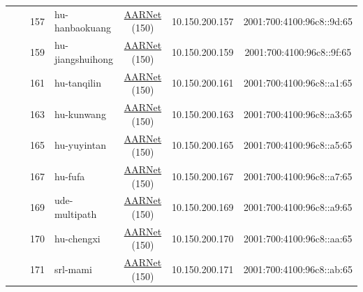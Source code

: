 \begin{small}
\begin{center}
\begin{longtable}{|c|c|c|c|c|c|c|c|}
  &  & \tiny{157} & \multicolumn{1}{|l|}{\tiny{hu-hanbaokuang}} & \multicolumn{2}{|c|}{\tiny{\href{https://www.aarnet.edu.au/}{AARNet} (150)}} & \tiny{10.150.200.157} & \tiny{2001:700:4100:96c8::9d:65} \\* \cline{3-3}\cline{4-4}\cline{5-5}\cline{6-6}\cline{7-7}\cline{8-8}
  &  & \tiny{159} & \multicolumn{1}{|l|}{\tiny{hu-jiangshuihong}} & \multicolumn{2}{|c|}{\tiny{\href{https://www.aarnet.edu.au/}{AARNet} (150)}} & \tiny{10.150.200.159} & \tiny{2001:700:4100:96c8::9f:65} \\* \cline{3-3}\cline{4-4}\cline{5-5}\cline{6-6}\cline{7-7}\cline{8-8}
  &  & \tiny{161} & \multicolumn{1}{|l|}{\tiny{hu-tanqilin}} & \multicolumn{2}{|c|}{\tiny{\href{https://www.aarnet.edu.au/}{AARNet} (150)}} & \tiny{10.150.200.161} & \tiny{2001:700:4100:96c8::a1:65} \\* \cline{3-3}\cline{4-4}\cline{5-5}\cline{6-6}\cline{7-7}\cline{8-8}
  &  & \tiny{163} & \multicolumn{1}{|l|}{\tiny{hu-kunwang}} & \multicolumn{2}{|c|}{\tiny{\href{https://www.aarnet.edu.au/}{AARNet} (150)}} & \tiny{10.150.200.163} & \tiny{2001:700:4100:96c8::a3:65} \\* \cline{3-3}\cline{4-4}\cline{5-5}\cline{6-6}\cline{7-7}\cline{8-8}
  &  & \tiny{165} & \multicolumn{1}{|l|}{\tiny{hu-yuyintan}} & \multicolumn{2}{|c|}{\tiny{\href{https://www.aarnet.edu.au/}{AARNet} (150)}} & \tiny{10.150.200.165} & \tiny{2001:700:4100:96c8::a5:65} \\* \cline{3-3}\cline{4-4}\cline{5-5}\cline{6-6}\cline{7-7}\cline{8-8}
  &  & \tiny{167} & \multicolumn{1}{|l|}{\tiny{hu-fufa}} & \multicolumn{2}{|c|}{\tiny{\href{https://www.aarnet.edu.au/}{AARNet} (150)}} & \tiny{10.150.200.167} & \tiny{2001:700:4100:96c8::a7:65} \\* \cline{3-3}\cline{4-4}\cline{5-5}\cline{6-6}\cline{7-7}\cline{8-8}
  &  & \tiny{169} & \multicolumn{1}{|l|}{\tiny{ude-multipath}} & \multicolumn{2}{|c|}{\tiny{\href{https://www.aarnet.edu.au/}{AARNet} (150)}} & \tiny{10.150.200.169} & \tiny{2001:700:4100:96c8::a9:65} \\* \cline{3-3}\cline{4-4}\cline{5-5}\cline{6-6}\cline{7-7}\cline{8-8}
  &  & \tiny{170} & \multicolumn{1}{|l|}{\tiny{hu-chengxi}} & \multicolumn{2}{|c|}{\tiny{\href{https://www.aarnet.edu.au/}{AARNet} (150)}} & \tiny{10.150.200.170} & \tiny{2001:700:4100:96c8::aa:65} \\* \cline{3-3}\cline{4-4}\cline{5-5}\cline{6-6}\cline{7-7}\cline{8-8}
  &  & \tiny{171} & \multicolumn{1}{|l|}{\tiny{srl-mami}} & \multicolumn{2}{|c|}{\tiny{\href{https://www.aarnet.edu.au/}{AARNet} (150)}} & \tiny{10.150.200.171} & \tiny{2001:700:4100:96c8::ab:65} \\ \hline
\end{longtable}
\end{center}
\end{small}




